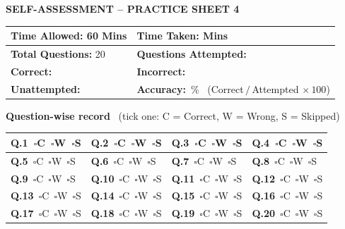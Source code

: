 \documentclass[11pt,a4paper]{article}
\begin{document}
\clearpage
\begin{center}{\Large\bfseries SELF-ASSESSMENT -- PRACTICE SHEET 4}\end{center}
\medskip
\renewcommand{\arraystretch}{1.9}
\noindent\begin{tabularx}{\linewidth}{|X|X|}\hline
\textbf{Time Allowed:} 60 Mins & \textbf{Time Taken:} \underline{\hspace{2.4cm}} Mins\\ \hline
\textbf{Total Questions:} 20 & \textbf{Questions Attempted:} \underline{\hspace{2cm}}\\ \hline
\textbf{Correct:} \underline{\hspace{2.6cm}} & \textbf{Incorrect:} \underline{\hspace{2.6cm}}\\ \hline
\textbf{Unattempted:} \underline{\hspace{2.2cm}} & \textbf{Accuracy:} \underline{\hspace{1.6cm}}\,\% \ {\footnotesize(Correct$\,/\,$Attempted$\,\times100$)}\\ \hline
\end{tabularx}
\renewcommand{\arraystretch}{1.0}
\bigskip
\textbf{Question-wise record} \ {\small(tick one: C = Correct, W = Wrong, S = Skipped)}\par\smallskip
{\small\renewcommand{\arraystretch}{1.55}
\noindent\begin{tabularx}{\linewidth}{|*{4}{>{\centering\arraybackslash}X|}}\hline
\textbf{Q.1}\ $\square$C\ $\square$W\ $\square$S & \textbf{Q.2}\ $\square$C\ $\square$W\ $\square$S & \textbf{Q.3}\ $\square$C\ $\square$W\ $\square$S & \textbf{Q.4}\ $\square$C\ $\square$W\ $\square$S \\ \hline
\textbf{Q.5}\ $\square$C\ $\square$W\ $\square$S & \textbf{Q.6}\ $\square$C\ $\square$W\ $\square$S & \textbf{Q.7}\ $\square$C\ $\square$W\ $\square$S & \textbf{Q.8}\ $\square$C\ $\square$W\ $\square$S \\ \hline
\textbf{Q.9}\ $\square$C\ $\square$W\ $\square$S & \textbf{Q.10}\ $\square$C\ $\square$W\ $\square$S & \textbf{Q.11}\ $\square$C\ $\square$W\ $\square$S & \textbf{Q.12}\ $\square$C\ $\square$W\ $\square$S \\ \hline
\textbf{Q.13}\ $\square$C\ $\square$W\ $\square$S & \textbf{Q.14}\ $\square$C\ $\square$W\ $\square$S & \textbf{Q.15}\ $\square$C\ $\square$W\ $\square$S & \textbf{Q.16}\ $\square$C\ $\square$W\ $\square$S \\ \hline
\textbf{Q.17}\ $\square$C\ $\square$W\ $\square$S & \textbf{Q.18}\ $\square$C\ $\square$W\ $\square$S & \textbf{Q.19}\ $\square$C\ $\square$W\ $\square$S & \textbf{Q.20}\ $\square$C\ $\square$W\ $\square$S \\ \hline
\end{tabularx}}
\end{document}
